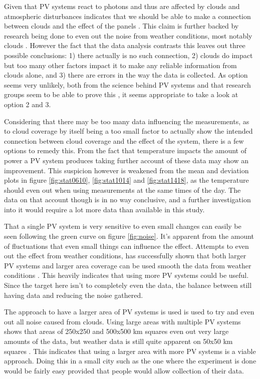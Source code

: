 Given that PV systems react to photons and thus are affected by clouds
and atmospheric disturbances indicates that we should be able to make
a connection between clouds and the effect of the panels
\citep{photovoltaic}.  This claim is further backed by research being
done to even out the noise from weather conditions, most notably
clouds \citep{southafrica, cloudTrack}.  However the fact that the
data analysis contrasts this leaves out three possible conclusions: 1)
there actually is no such connection, 2) clouds do impact but too many
other factors impact it to make any reliable information from clouds
alone, and 3) there are errors in the way the data is collected.  As
option seems very unlikely, both from the science behind PV systems
and that research groups seem to be able to prove this
\citep{southafrica, cloudTrack, photovoltaic}, it seems appropriate to
take a look at option 2 and 3.

Considering that there may be too many data influencing the
measurements, as to cloud coverage by itself being a too small factor
to actually show the intended connection between cloud coverage and
the effect of the system, there is a few options to remedy this.  From
the fact that temperature impacts the amount of power a PV system
produces \citep{mppt2004} taking further account of these data may
show an improvement.  This suspicion however is weakened from the mean
and deviation plots in figure \ref{fig:stat0610}, \ref{fig:stat1014}
and \ref{fig:stat1418}, as the temperature should even out when using
measurements at the same times of the day.  The data on that account
though is in no way conclusive, and a further investigation into it
would require a lot more data than available in this study.

That a single PV system is very sensitive to even small changes can
easily be seen following the green curve on figure \ref{fig:noise}.
It's apparent from the amount of fluctuations that even small things
can influence the effect.  Attempts to even out the effect from
weather conditions, has successfully shown that both larger PV systems
and larger area coverage can be used smooth the data from weather
conditions \citep{cloudTrack,southafrica}.  This heavily indicates
that using more PV systems could be useful.  Since the target here
isn't to completely even the data, the balance between still having
data and reducing the noise gathered.

The approach to have a larger area of PV systems is used is used to
try and even out all noise caused from clouds.  Using large areas with
multiple PV systems shows that areas of 250x250 and 500x500 km squares
even out very large amounts of the data, but weather data is still
quite apparent on 50x50 km squares \citep{southafrica}.  This
indicates that using a larger area with more PV systems is a viable
approach.  Doing this in a small city such as the one where the
experiment is done would be fairly easy provided that people would
allow collection of their data.

